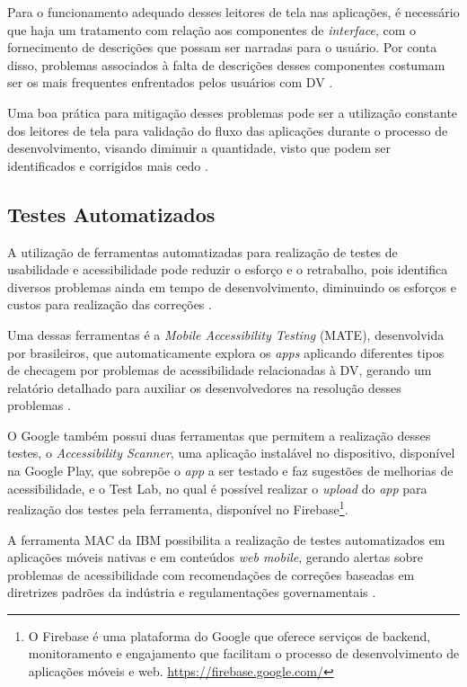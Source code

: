 Para o funcionamento adequado desses leitores de tela nas aplicações, é necessário que haja um tratamento
com relação aos componentes de \emph{interface}, com o fornecimento de descrições que possam ser narradas para o usuário. Por conta disso,
problemas associados à falta de descrições desses componentes costumam ser os mais frequentes enfrentados pelos usuários com DV
\cite{Vendome201941,Christoph2020,Shera2021285}.

Uma boa prática para mitigação desses problemas pode ser a utilização constante dos leitores de tela para validação do fluxo das aplicações durante
o processo de desenvolvimento, visando diminuir a quantidade, visto que podem ser identificados e corrigidos mais cedo \cite{Tomlinson2016377}.

\subsection{Testes Automatizados}

A utilização de ferramentas automatizadas para realização de testes de usabilidade e acessibilidade pode reduzir o esforço
e o retrabalho, pois identifica diversos problemas ainda em tempo de desenvolvimento, diminuindo os esforços e custos para
realização das correções \cite{Christoph2020}.

Uma dessas ferramentas é a \emph{Mobile Accessibility Testing} (MATE), desenvolvida por brasileiros, que automaticamente explora os \emph{apps}
aplicando diferentes tipos de checagem por problemas de acessibilidade relacionadas à DV, gerando um relatório detalhado para auxiliar
os desenvolvedores na resolução desses problemas \cite{Eler2018AutomatedAT}.

O Google também possui duas ferramentas que permitem a realização desses testes, o \emph{Accessibility Scanner}, uma aplicação instalável no
dispositivo, disponível na Google Play,
que sobrepõe o \emph{app} a ser testado e faz sugestões de melhorias de acessibilidade, e o Test Lab, no qual é possível realizar o \emph{upload}
do \emph{app} para realização dos testes pela ferramenta, disponível no Firebase\footnote{O Firebase é uma plataforma do Google
que oferece serviços de backend, monitoramento e engajamento que facilitam o processo de desenvolvimento
de aplicações móveis e web. \url{https://firebase.google.com/}}.

A ferramenta MAC da IBM possibilita a realização de testes automatizados em aplicações
móveis nativas e em conteúdos \emph{web mobile}, gerando alertas sobre problemas de acessibilidade com recomendações de
correções baseadas em diretrizes padrões da indústria e regulamentações governamentais \cite{patil2016enhanced,Yan2019}.

